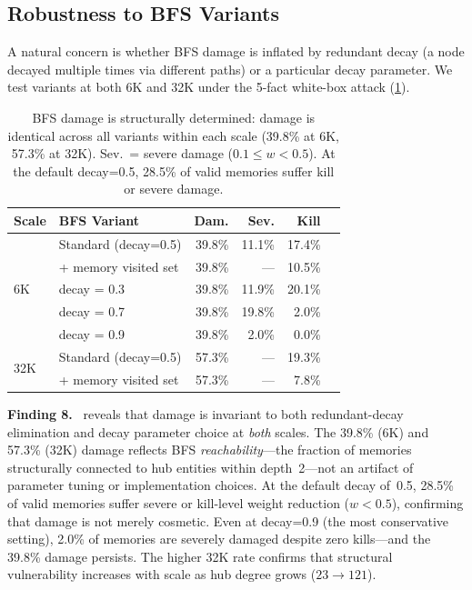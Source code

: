 \documentclass{article}
\newcommand{\finding}[1]{\vspace{2pt}\noindent\textbf{Finding #1.}~}
\begin{document}
\subsection{Robustness to BFS Variants}

A natural concern is whether BFS damage is inflated by redundant decay (a node decayed multiple times via different paths) or a particular decay parameter.
We test variants at both 6K and 32K under the 5-fact white-box attack (\cref{tab:robust}).

\begin{table}[htbp]
\centering
\footnotesize
\begin{tabular}{llrrrr}
\toprule
\textbf{Scale} & \textbf{BFS Variant} & \textbf{Dam.} & \textbf{Sev.} & \textbf{Kill} \\
\midrule
\multirow{5}{*}{6K} & Standard (decay=0.5) & 39.8\% & 11.1\% & 17.4\% \\
& + memory visited set & 39.8\% & --- & 10.5\% \\
\cmidrule{2-5}
& decay = 0.3 & 39.8\% & 11.9\% & 20.1\% \\
& decay = 0.7 & 39.8\% & 19.8\% & 2.0\% \\
& decay = 0.9 & 39.8\% & 2.0\% & 0.0\% \\
\midrule
\multirow{2}{*}{32K} & Standard (decay=0.5) & 57.3\% & --- & 19.3\% \\
& + memory visited set & 57.3\% & --- & 7.8\% \\
\bottomrule
\end{tabular}
\caption{BFS damage is structurally determined: damage is identical across all variants within each scale (39.8\% at 6K, 57.3\% at 32K). Sev.\ = severe damage ($0.1 \leq w < 0.5$). At the default decay=0.5, 28.5\% of valid memories suffer kill or severe damage.}
\label{tab:robust}
\end{table}

\finding{8}  reveals that damage is invariant to both redundant-decay elimination and decay parameter choice at \textit{both} scales.
The 39.8\% (6K) and 57.3\% (32K) damage reflects BFS \textit{reachability}---the fraction of memories structurally connected to hub entities within depth~2---not an artifact of parameter tuning or implementation choices.
At the default decay of~0.5, 28.5\% of valid memories suffer severe or kill-level weight reduction ($w < 0.5$), confirming that damage is not merely cosmetic.
Even at decay=0.9 (the most conservative setting), 2.0\% of memories are severely damaged despite zero kills---and the 39.8\% damage persists.
The higher 32K rate confirms that structural vulnerability increases with scale as hub degree grows ($23 \rightarrow 121$).
\end{document}
